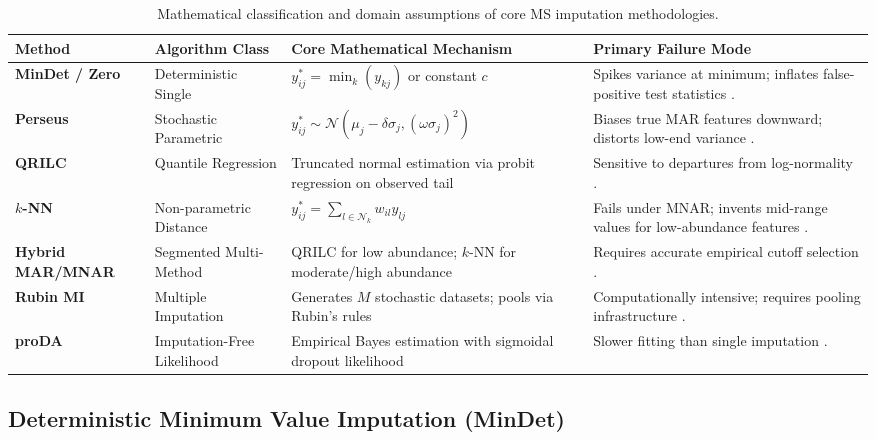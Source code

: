 \documentclass[11pt,oneside]{book}
\begin{document}
\begin{table}[htbp]
\centering
\caption{Mathematical classification and domain assumptions of core MS imputation methodologies.}
\label{tab:imputation_comparison}
\small
\begin{tabularx}{\textwidth}{l p{3.2cm} p{4.0cm} X}
\toprule
\textbf{Method} & \textbf{Algorithm Class} & \textbf{Core Mathematical Mechanism} & \textbf{Primary Failure Mode} \\
\midrule
\textbf{MinDet / Zero} & Deterministic Single & $y_{ij}^* = \min_k(y_{kj})$ or constant $c$ & Spikes variance at minimum; inflates false-positive test statistics \cite{lazar2016accounting}. \\
\addlinespace
\textbf{Perseus} & Stochastic Parametric & $y_{ij}^* \sim \mathcal{N}(\mu_j - \delta \sigma_j, (\omega \sigma_j)^2)$ & Biases true MAR features downward; distorts low-end variance \cite{tyanova2016perseus}. \\
\addlinespace
\textbf{QRILC} & Quantile Regression & Truncated normal estimation via probit regression on observed tail & Sensitive to departures from log-normality \cite{lazar2016accounting}. \\
\addlinespace
\textbf{$k$-NN} & Non-parametric Distance & $y_{ij}^* = \sum_{l \in \mathcal{N}_k} w_{il} y_{lj}$ & Fails under MNAR; invents mid-range values for low-abundance features \cite{hastie2001impute}. \\
\addlinespace
\textbf{Hybrid MAR/MNAR} & Segmented Multi-Method & QRILC for low abundance; $k$-NN for moderate/high abundance & Requires accurate empirical cutoff selection \cite{palstrom2020imputation}. \\
\addlinespace
\textbf{Rubin MI} & Multiple Imputation & Generates $M$ stochastic datasets; pools via Rubin's rules & Computationally intensive; requires pooling infrastructure \cite{rubin1987multiple, barnard1999small}. \\
\addlinespace
\textbf{proDA} & Imputation-Free Likelihood & Empirical Bayes estimation with sigmoidal dropout likelihood & Slower fitting than single imputation \cite{ahlmann2020proda}. \\
\bottomrule
\end{tabularx}
\end{table}

\subsection{Deterministic Minimum Value Imputation (MinDet)}
\end{document}
